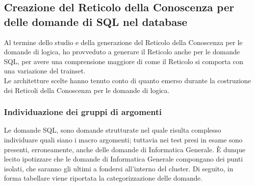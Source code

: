 \subsection{Creazione del Reticolo della Conoscenza per delle domande di SQL nel database}
\label{Creazione del Reticolo della Conoscenza per delle domande di sql nel database}
Al termine dello studio e della generazione del Reticolo della Conoscenza per le domande di logica, ho provveduto a generare il Reticolo anche per le domande SQL,  per avere una comprensione maggiore di come il Reticolo si comporta con una variazione del trainset.\\
Le architetture scelte hanno tenuto conto di quanto emerso durante la costruzione dei Reticoli della Conoscenza per le domande di logica.

\subsubsection{Individuazione dei gruppi di argomenti}
\label{Individuazione dei gruppi di argomenti 120}
Le domande SQL, sono domande strutturate nel quale risulta complesso individuare quali siano i macro argomenti; tuttavia nei test presi in esame sono presenti, erroneamente, anche delle domande di Informatica Generale.
\`E dunque lecito ipotizzare che le domande di Informatica Generale compongano dei punti isolati, che saranno gli ultimi a fondersi all'interno del cluster.
\noindent
Di seguito, in forma tabellare viene riportata la categorizzazione delle domande.
\pagebreak
